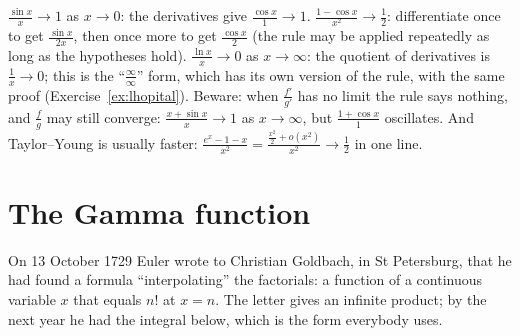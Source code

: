 \begin{examplex}
$\frac{\sin x}x\to1$ as $x\to0$: the derivatives give $\frac{\cos x}1\to1$. $\frac{1-\cos x}{x^2}\to\frac12$: differentiate once to get $\frac{\sin x}{2x}$, then once more to get $\frac{\cos x}2$ (the rule may be applied repeatedly as long as the hypotheses hold). $\frac{\ln x}{x}\to0$ as $x\to\infty$: the quotient of derivatives is $\frac1x\to0$; this is the ``$\frac\infty\infty$'' form, which has its own version of the rule, with the same proof (Exercise~\ref{ex:lhopital}). Beware: when $\frac{f'}{g'}$ has no limit the rule says nothing, and $\frac fg$ may still converge: $\frac{x+\sin x}x\to1$ as $x\to\infty$, but $\frac{1+\cos x}1$ oscillates. And Taylor--Young is usually faster: $\frac{e^x-1-x}{x^2}=\frac{\frac{x^2}2+o(x^2)}{x^2}\to\frac12$ in one line.
\end{examplex}

\section{The Gamma function}

On 13 October 1729 Euler wrote to Christian Goldbach, in St Petersburg, that he had found a formula ``interpolating'' the factorials: a function of a
continuous variable $x$ that equals $n!$ at $x=n$. The letter gives an infinite product; by the next year he had the integral below, which is the form everybody uses.

